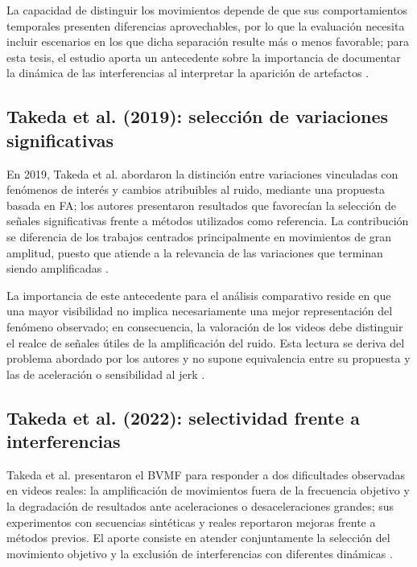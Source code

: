 La capacidad de distinguir los movimientos depende de que sus comportamientos temporales presenten diferencias aprovechables, por lo que la evaluación necesita incluir escenarios en los que dicha separación resulte más o menos favorable; para esta tesis, el estudio aporta un antecedente sobre la importancia de documentar la dinámica de las interferencias al interpretar la aparición de artefactos \cite{takeda2018jerk}.

\subsection{Takeda et al. (2019): selección de variaciones significativas}

En 2019, Takeda et al. abordaron la distinción entre variaciones vinculadas con fenómenos de interés y cambios atribuibles al ruido, mediante una propuesta basada en \gls{FA}; los autores presentaron resultados que favorecían la selección de señales significativas frente a métodos utilizados como referencia. La contribución se diferencia de los trabajos centrados principalmente en movimientos de gran amplitud, puesto que atiende a la relevancia de las variaciones que terminan siendo amplificadas \cite{takeda2019wild}.

La importancia de este antecedente para el análisis comparativo reside en que una mayor visibilidad no implica necesariamente una mejor representación del fenómeno observado; en consecuencia, la valoración de los videos debe distinguir el realce de señales útiles de la amplificación del ruido. Esta lectura se deriva del problema abordado por los autores y no supone equivalencia entre su propuesta y las de aceleración o sensibilidad al jerk \cite{takeda2019wild}.

\subsection{Takeda et al. (2022): selectividad frente a interferencias}

Takeda et al. presentaron el \gls{BVMF} para responder a dos dificultades observadas en videos reales: la amplificación de movimientos fuera de la frecuencia objetivo y la degradación de resultados ante aceleraciones o desaceleraciones grandes; sus experimentos con secuencias sintéticas y reales reportaron mejoras frente a métodos previos. El aporte consiste en atender conjuntamente la selección del movimiento objetivo y la exclusión de interferencias con diferentes dinámicas \cite{takeda2022bilateral}.

